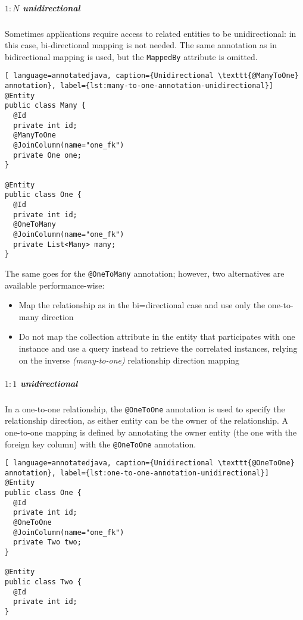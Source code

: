 \documentclass[english]{article}
\begin{document}
\begin{onepage}
  \subparagraph*{\(1:N\) unidirectional}

  Sometimes applications require access to related entities to be unidirectional: in this case, bi-directional mapping is not needed.
  The same annotation as in bidirectional mapping is used, but the \texttt{MappedBy} attribute is omitted.

  \begin{lstlisting}[ language=annotatedjava, caption={Unidirectional \texttt{@ManyToOne} annotation}, label={lst:many-to-one-annotation-unidirectional}]
@Entity
public class Many {
  @Id
  private int id;
  @ManyToOne
  @JoinColumn(name="one_fk")
  private One one;
}

@Entity
public class One {
  @Id
  private int id;
  @OneToMany
  @JoinColumn(name="one_fk")
  private List<Many> many;
}
\end{lstlisting}

  The same goes for the \texttt{@OneToMany} annotation;
  however, two alternatives are available performance-wise:

  \begin{itemize}
    \item Map the relationship as in the bi=directional case and use only the one-to-many direction
    \item Do not map the collection attribute in the entity that participates with one instance and use a query instead to retrieve the correlated instances, relying on the inverse \textit{(many-to-one)} relationship direction mapping
  \end{itemize}
\end{onepage}

\begin{onepage}
  \subparagraph*{\(1:1\) unidirectional}
  In a one-to-one relationship, the \texttt{@OneToOne} annotation is used to specify the relationship direction, as either entity can be the owner of the relationship.
  A one-to-one mapping is defined by annotating the owner entity (the one with the foreign key column) with the \texttt{@OneToOne} annotation.

  \begin{lstlisting}[ language=annotatedjava, caption={Unidirectional \texttt{@OneToOne} annotation}, label={lst:one-to-one-annotation-unidirectional}]
@Entity
public class One {
  @Id
  private int id;
  @OneToOne
  @JoinColumn(name="one_fk")
  private Two two;
}

@Entity
public class Two {
  @Id
  private int id;
}
\end{lstlisting}
\end{onepage}
\end{document}
